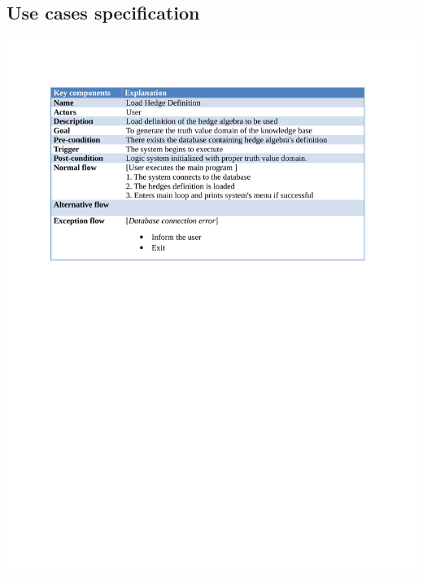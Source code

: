 \documentclass[26pt,fleqn,]{article}
\begin{document}
\subsection{Use cases specification}
\includegraphics[clip=true, trim = 50 0 0 0, scale=0.8, page=1]{UCdesc}
\end{document}
